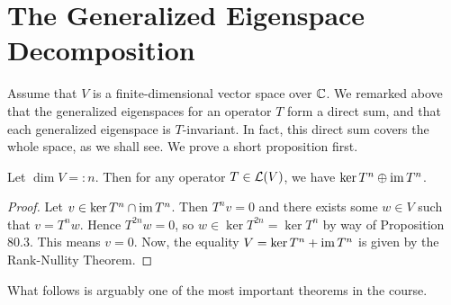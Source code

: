 \documentclass{article}
\begin{document}
\section{The Generalized Eigenspace Decomposition}
Assume that $V$ is a finite-dimensional vector space over $\mathbb C$. We remarked above that the generalized eigenspaces for an operator $T$ form a direct sum, and that each generalized eigenspace is $T$-invariant. In fact, this direct sum covers the whole space, as we shall see. We prove a short proposition first.
\begin{proposition}
Let $\dim V =: n$. Then for any operator $T\in\mathcal L(V)$, we have $\ker T^n \oplus \operatorname{im} T^n$.
\end{proposition}
\begin{proof}
Let $v\in \ker T^n \cap \operatorname{im} T^n$. Then $T^nv = 0$ and there exists some $w\in V$ such that $v = T^nw$. Hence $T^{2n}w = 0$, so $w \in \ker T^{2n} = \ker T^n$ by way of Proposition 80.3. This means $v=0$. Now, the equality $V = \ker T^n + \operatorname{im} T^n$ is given by the Rank-Nullity Theorem.
\end{proof}

What follows is arguably one of the most important theorems in the course.
\end{document}
